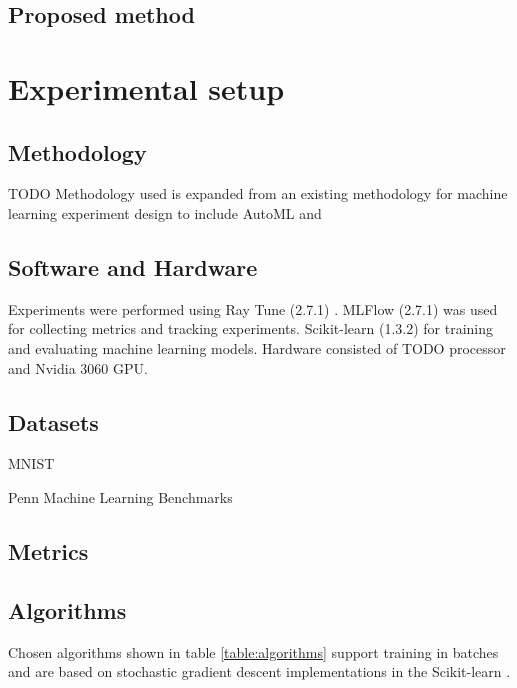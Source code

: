 \subsection{Proposed method}




\section{Experimental setup}

\subsection{Methodology}
TODO Methodology used is expanded from an existing methodology for machine learning experiment design \parencite{fernandez-lozanoMethodologyDesignExperiments2016} to include AutoML and

\subsection{Software and Hardware}

Experiments were performed using Ray Tune (2.7.1) \parencite{liawTuneResearchPlatform2018}. MLFlow (2.7.1) \parencite{chenDevelopmentsMLflowSystem2020} was used for collecting metrics and tracking experiments. Scikit-learn (1.3.2) \parencite{pedregosaScikitlearnMachineLearning2011} for training and evaluating machine learning models. Hardware consisted of TODO processor and Nvidia 3060 GPU.

\subsection{Datasets}
MNIST \parencite{dengMNISTDatabaseHandwritten2012}

Penn Machine Learning Benchmarks \parencite{olsonPMLBLargeBenchmark2017}
\subsection{Metrics}
\subsection{Algorithms}

Chosen algorithms shown in table \ref{table:algorithms} support training in batches and are based on stochastic gradient descent implementations in the Scikit-learn \parencite{pedregosaScikitlearnMachineLearning2011}.

